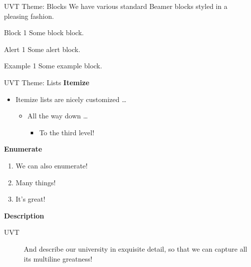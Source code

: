 \documentclass[aspectratio=169, t]{beamer}
\begin{document}
\begin{frame}{UVT Theme: Blocks}
We have various standard Beamer blocks styled in a pleasing fashion.

\vfill

\begin{block}{Block 1}
Some block block.
\end{block}

\vfill

\begin{alertblock}{Alert 1}
Some alert block.
\end{alertblock}

\vfill

\begin{exampleblock}{Example 1}
Some example block.
\end{exampleblock}
\end{frame}

\begin{frame}{UVT Theme: Lists}
\textbf{Itemize}

\begin{itemize}
    \item Itemize lists are nicely customized \dots
    \begin{itemize}
        \item All the way down \dots
        \begin{itemize}
            \item To the third level!
        \end{itemize}
    \end{itemize}
\end{itemize}

\textbf{Enumerate}

\begin{enumerate}
    \item We can also enumerate!
    \item Many things!
    \item It's great!
\end{enumerate}

\textbf{Description}

\begin{description}
    \item[UVT] And describe our university in exquisite detail, so that we
        can capture all its multiline greatness!
\end{description}
\end{frame}
\end{document}
